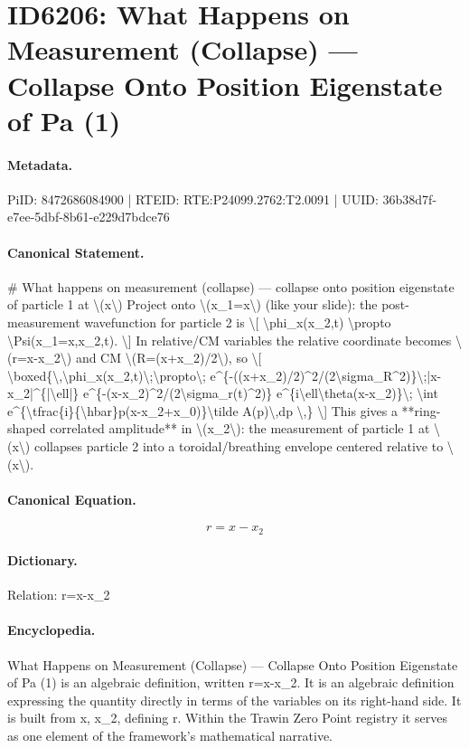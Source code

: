 \section*{ID6206: What Happens on Measurement (Collapse) — Collapse Onto Position Eigenstate of Pa (1)}
\paragraph{Metadata.}
PiID: 8472686084900 | RTEID: RTE:P24099.2762:T2.0091 | UUID: 36b38d7f-e7ee-5dbf-8b61-e229d7bdce76

\paragraph{Canonical Statement.}
\# What happens on measurement (collapse) — collapse onto position eigenstate of particle 1 at \textbackslash{}(x\textbackslash{}) Project onto \textbackslash{}(x\_1=x\textbackslash{}) (like your slide): the post-measurement wavefunction for particle 2 is \textbackslash{}[ \textbackslash{}phi\_x(x\_2,t) \textbackslash{}propto \textbackslash{}Psi(x\_1=x,x\_2,t). \textbackslash{}] In relative/CM variables the relative coordinate becomes \textbackslash{}(r=x-x\_2\textbackslash{}) and CM \textbackslash{}(R=(x+x\_2)/2\textbackslash{}), so \textbackslash{}[ \textbackslash{}boxed\{\textbackslash{},\textbackslash{}phi\_x(x\_2,t)\textbackslash{};\textbackslash{}propto\textbackslash{}; e\textasciicircum{}\{-((x+x\_2)/2)\textasciicircum{}2/(2\textbackslash{}sigma\_R\textasciicircum{}2)\}\textbackslash{};|x-x\_2|\textasciicircum{}\{|\textbackslash{}ell|\} e\textasciicircum{}\{-(x-x\_2)\textasciicircum{}2/(2\textbackslash{}sigma\_r(t)\textasciicircum{}2)\} e\textasciicircum{}\{i\textbackslash{}ell\textbackslash{}theta(x-x\_2)\}\textbackslash{}; \textbackslash{}int e\textasciicircum{}\{\textbackslash{}tfrac\{i\}\{\textbackslash{}hbar\}p(x-x\_2+x\_0)\}\textbackslash{}tilde A(p)\textbackslash{},dp \textbackslash{},\} \textbackslash{}] This gives a **ring-shaped correlated amplitude** in \textbackslash{}(x\_2\textbackslash{}): the measurement of particle 1 at \textbackslash{}(x\textbackslash{}) collapses particle 2 into a toroidal/breathing envelope centered relative to \textbackslash{}(x\textbackslash{}).

\paragraph{Canonical Equation.}
\[
r=x-x_2
\]

\paragraph{Dictionary.}
Relation: r=x-x\_2

\paragraph{Encyclopedia.}
What Happens on Measurement (Collapse) — Collapse Onto Position Eigenstate of Pa (1) is an algebraic definition, written r=x-x\_2. It is an algebraic definition expressing the quantity directly in terms of the variables on its right-hand side. It is built from x, x\_2, defining r. Within the Trawin Zero Point registry it serves as one element of the framework's mathematical narrative.
